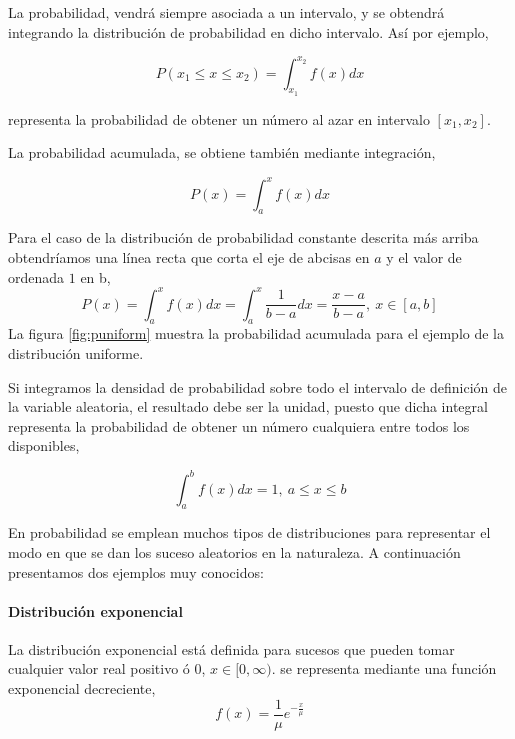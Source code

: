 La probabilidad, vendrá siempre asociada a un intervalo, y se obtendrá integrando la distribución de probabilidad en dicho intervalo. Así por ejemplo,

\begin{equation*}
P(x_1 \leqslant x \leqslant x_2) = \int_{x_1}^{x_2}f(x)dx
\end{equation*}

representa la probabilidad de obtener un número al azar en intervalo $[x_1,x_2]$. 

La probabilidad acumulada, se obtiene también mediante integración, 

\begin{equation*}
P(x) = \int_a^xf(x)dx
\end{equation*}

Para el caso de la distribución de probabilidad constante descrita más arriba obtendríamos una línea recta que corta el eje de abcisas en $a$ y el valor de ordenada $1$ en b,
\begin{equation*}
P(x) = \int_a^xf(x)dx = \int_a^x \frac{1}{b-a}dx = \frac{x-a}{b-a}, \ x \in[a,b]
\end{equation*}
La figura \ref{fig:puniform} muestra la probabilidad acumulada para el ejemplo de la distribución uniforme. 

Si integramos la densidad de probabilidad sobre todo el intervalo de definición de la variable aleatoria, el resultado debe ser la unidad, puesto que dicha integral representa la probabilidad de obtener un número cualquiera entre todos los disponibles,

\begin{equation*}
\int_a^b f(x)dx =1, \ a\leqslant x \leqslant b
\end{equation*}

En probabilidad se emplean muchos tipos de distribuciones para representar el modo en que se dan los suceso aleatorios en la naturaleza. A continuación presentamos dos ejemplos muy conocidos:

\paragraph{Distribución exponencial} 
La distribución exponencial está definida para sucesos que pueden tomar cualquier valor real positivo ó 0, $x \in [0,\infty)$. se representa mediante una función exponencial decreciente,
\begin{equation*}
f(x)=\frac{1}{\mu}e^{-\frac{x}{\mu}}
\end{equation*}

